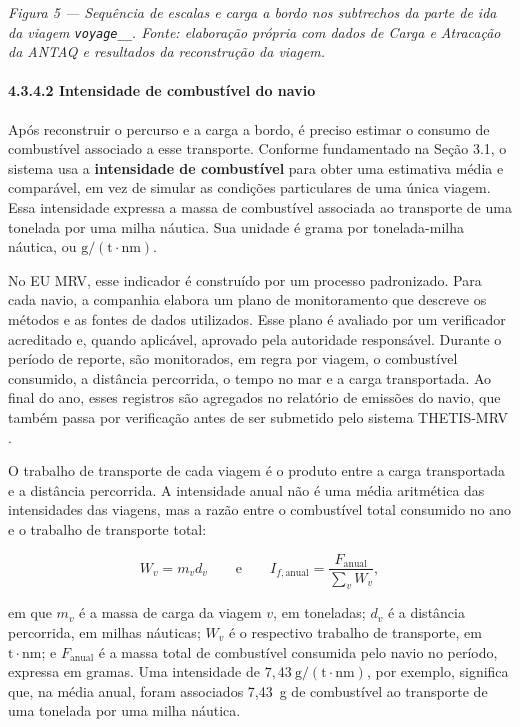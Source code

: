 \documentclass[brazil,]{article}
\let\oldparagraph\paragraph
\renewcommand{\paragraph}[1]{\Needspace{7\baselineskip}\oldparagraph{#1}\mbox{}}
\begin{document}
\emph{Figura 5 --- Sequência de escalas e carga a bordo nos subtrechos
da parte de ida da viagem
\texttt{voyage\_\_}. Fonte:
elaboração própria com dados de Carga e Atracação da ANTAQ e resultados
da reconstrução da viagem.}

\hypertarget{intensidade-de-combustuxedvel-do-navio}{%
\paragraph{4.3.4.2 Intensidade de combustível do
navio}\label{intensidade-de-combustuxedvel-do-navio}}

Após reconstruir o percurso e a carga a bordo, é preciso estimar o
consumo de combustível associado a esse transporte. Conforme
fundamentado na Seção 3.1, o sistema usa a \textbf{intensidade de
combustível} para obter uma estimativa média e comparável, em vez de
simular as condições particulares de uma única viagem. Essa intensidade
expressa a massa de combustível associada ao transporte de uma tonelada
por uma milha náutica. Sua unidade é grama por tonelada-milha náutica, ou
\(\mathrm{g/(t\cdot nm)}\).

No EU MRV, esse indicador é construído por um processo padronizado. Para
cada navio, a companhia elabora um plano de monitoramento que descreve os
métodos e as fontes de dados utilizados. Esse plano é avaliado por um
verificador acreditado e, quando aplicável, aprovado pela autoridade
responsável. Durante o período de reporte, são monitorados, em regra por
viagem, o combustível consumido, a distância percorrida, o tempo no mar e
a carga transportada. Ao final do ano, esses registros são agregados no
relatório de emissões do navio, que também passa por verificação antes de
ser submetido pelo sistema THETIS-MRV
\parencite[p. 9, 30--32 e 54--55]{ecmrvguide2025}.

O trabalho de transporte de cada viagem é o produto entre a carga
transportada e a distância percorrida. A intensidade anual não é uma
média aritmética das intensidades das viagens, mas a razão entre o
combustível total consumido no ano e o trabalho de transporte total:

\[
W_v=m_vd_v
\qquad\text{e}\qquad
I_{f,\mathrm{anual}}=\frac{F_{\mathrm{anual}}}{\sum_v W_v},
\]

em que \(m_v\) é a massa de carga da viagem \(v\), em toneladas; \(d_v\)
é a distância percorrida, em milhas náuticas; \(W_v\) é o respectivo
trabalho de transporte, em \(\mathrm{t\cdot nm}\); e
\(F_{\mathrm{anual}}\) é a massa total de combustível consumida pelo
navio no período, expressa em gramas. Uma intensidade de
\(7{,}43\ \mathrm{g/(t\cdot nm)}\), por exemplo, significa que, na média
anual, foram associados 7,43~g de combustível ao transporte de uma
tonelada por uma milha náutica.
\end{document}
